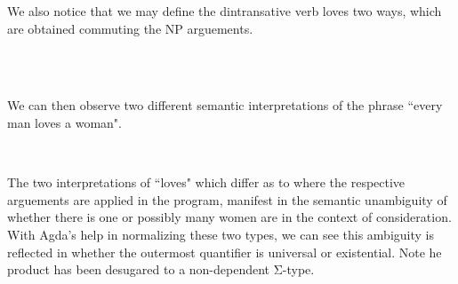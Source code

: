 We also notice that we may define the dintransative verb loves two ways, which
are obtained commuting the NP arguements.

\begin{code}%
\>[0]\AgdaSpace{}%
\AgdaSpace{}%
\AgdaSymbol{:}\AgdaSpace{}%
\<%
\\
\>[0]\AgdaSpace{}%
\AgdaSpace{}%
\AgdaSpace{}%
\AgdaSymbol{=}\AgdaSpace{}%
\AgdaSpace{}%
\AgdaSpace{}%
\AgdaSpace{}%
\AgdaSpace{}%
\AgdaSpace{}%
\AgdaSpace{}%
\AgdaSpace{}%
\AgdaSpace{}%
\AgdaSpace{}%
\AgdaSpace{}%
\AgdaSymbol{)}%
\>[42]\<%
\\
\>[0]\AgdaSpace{}%
\AgdaSpace{}%
\AgdaSpace{}%
\AgdaSymbol{=}\AgdaSpace{}%
\AgdaSpace{}%
\AgdaSpace{}%
\AgdaSpace{}%
\AgdaSpace{}%
\AgdaSpace{}%
\AgdaSpace{}%
\AgdaSpace{}%
\AgdaSpace{}%
\AgdaSpace{}%
\AgdaSpace{}%
\AgdaSymbol{)}%
\>[42]\<%
\end{code}

We can then observe two different semantic interpretations of the phrase ``every
man loves a woman".

\begin{code}%
\>[0]\AgdaSpace{}%
\AgdaSymbol{=}\AgdaSpace{}%
\AgdaSpace{}%
\AgdaSymbol{(}\AgdaSpace{}%
\AgdaSymbol{)}\AgdaSpace{}%
\AgdaSymbol{(}\AgdaSpace{}%
\AgdaSpace{}%
\AgdaSymbol{(}\AgdaSpace{}%
\AgdaSymbol{))}%
\>[69]\<%
\\
\>[0]\AgdaSpace{}%
\AgdaSymbol{=}\AgdaSpace{}%
\AgdaSpace{}%
\AgdaSymbol{(}\AgdaSpace{}%
\AgdaSymbol{)}\AgdaSpace{}%
\AgdaSymbol{(}\AgdaSpace{}%
\AgdaSpace{}%
\AgdaSymbol{(}\AgdaSpace{}%
\AgdaSymbol{))}\AgdaSpace{}%
\<%
\end{code}

The two interpretations of ``loves" which differ as to where the respective
arguements are applied in the program, manifest in the semantic unambiguity of
whether there is one or possibly many women are in the context of consideration.
With Agda's help in normalizing these two types, we can see this ambiguity is
reflected in whether the outermost quantifier is universal or existential. Note
he product has been desugared to a non-dependent Σ-type.

